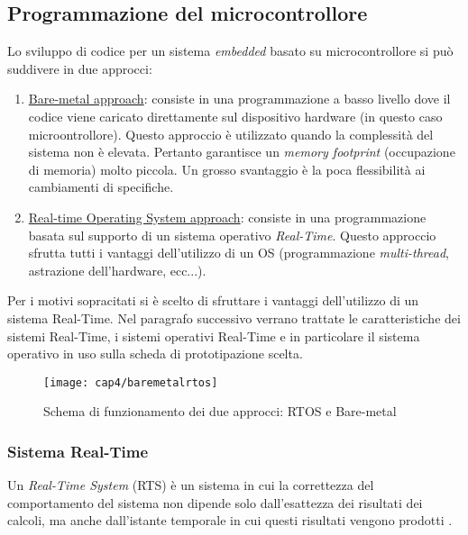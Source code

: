 \subsection{Programmazione del microcontrollore}
	Lo sviluppo di codice per un sistema \textit{embedded} basato su microcontrollore si può suddivere in due approcci:
	\begin{enumerate}
		\item \underline{Bare-metal approach}: consiste in una programmazione a basso livello dove il codice viene caricato direttamente sul dispositivo hardware (in questo caso microontrollore).  Questo approccio è utilizzato quando la complessità del sistema non è elevata. Pertanto garantisce un \textit{memory footprint} (occupazione di memoria) molto piccola. Un grosso svantaggio è la poca flessibilità ai cambiamenti di specifiche.
		\item \underline{Real-time Operating System approach}: consiste in una programmazione basata sul supporto di un sistema operativo \textit{Real-Time}. Questo approccio sfrutta tutti i vantaggi dell'utilizzo di un OS (programmazione \textit{multi-thread}, astrazione dell'hardware, ecc...).
	\end{enumerate}
	
	Per i motivi sopracitati si è scelto di sfruttare i vantaggi dell'utilizzo di un sistema Real-Time. Nel paragrafo successivo verrano trattate le caratteristiche dei sistemi Real-Time, i sistemi operativi Real-Time e in particolare il sistema operativo in uso sulla scheda di prototipazione scelta.
	
\begin{figure}[H]  
  \begin{center}
    \texttt{[image: cap4/baremetalrtos]}
    \caption{Schema di funzionamento dei due approcci: RTOS e Bare-metal}
  \end{center}
\end{figure}
	
\subsubsection{Sistema Real-Time}

Un \textit{Real-Time System} (RTS) è un sistema in cui la correttezza del comportamento del sistema non dipende solo dall'esattezza dei risultati dei calcoli, ma anche dall'istante temporale in cui questi risultati vengono prodotti \cite{kopetzrt}.

